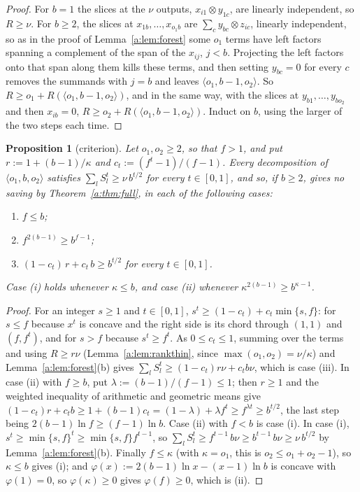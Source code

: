 \documentclass[11pt]{article}
\newtheorem{proposition}[theorem]{Proposition}
\theoremstyle{definition}
\theoremstyle{remark}
\begin{document}
\begin{proof}
For $b=1$ the slices at the $\nu$ outputs, $x_{i1}\otimes y_{1c}$, are linearly independent, so $R\ge \nu$. For $b\ge2$, the slices at $x_{1b},\dots,x_{o_1b}$ are $\sum_cy_{bc}\otimes z_{ic}$, linearly independent, so as in the proof of Lemma~\ref{a:lem:forest} some $o_1$ terms have left factors spanning a complement of the span of the $x_{ij}$, $j<b$. Projecting the left factors onto that span along them kills these terms, and then setting $y_{bc}=0$ for every $c$ removes the summands with $j=b$ and leaves $\langle o_1,b-1,o_2\rangle$. So $R\ge o_1+R(\langle o_1,b-1,o_2\rangle)$, and in the same way, with the slices at $y_{b1},\dots,y_{bo_2}$ and then $x_{ib}=0$, $R\ge o_2+R(\langle o_1,b-1,o_2\rangle)$. Induct on $b$, using the larger of the two steps each time.
\end{proof}

\begin{proposition}[criterion]\label{a:prop:criterion}
Let $o_1,o_2\ge2$, so that $f>1$, and put $r:=1+(b-1)/\kappa$ and $c_t:=(f^t-1)/(f-1)$. Every decomposition of $\langle o_1,b,o_2\rangle$ satisfies $\sum_lS_l^t\ge \nu\,b^{t/2}$ for every $t\in[0,1]$, and so, if $b\ge2$, gives no saving by Theorem~\ref{a:thm:full}, in each of the following cases:
\begin{enumerate}[label=(\roman*),nosep]
\item $f\le b$;
\item $f^{2(b-1)}\ge b^{f-1}$;
\item $(1-c_t)\,r+c_t\,b\ge b^{t/2}$ for every $t\in[0,1]$.
\end{enumerate}
Case (i) holds whenever $\kappa\le b$, and case (ii) whenever $\kappa^{2(b-1)}\ge b^{\kappa-1}$.
\end{proposition}

\begin{proof}
For an integer $s\ge1$ and $t\in[0,1]$, $s^t\ge(1-c_t)+c_t\min\{s,f\}$: for $s\le f$ because $x^t$ is concave and the right side is its chord through $(1,1)$ and $(f,f^t)$, and for $s>f$ because $s^t\ge f^t$. As $0\le c_t\le1$, summing over the terms and using $R\ge r\nu$ (Lemma~\ref{a:lem:rankthin}, since $\max(o_1,o_2)=\nu/\kappa$) and Lemma~\ref{a:lem:forest}(b) gives $\sum_lS_l^t\ge(1-c_t)r\nu+c_tb\nu$, which is case (iii). In case (ii) with $f\ge b$, put $\lambda:=(b-1)/(f-1)\le1$; then $r\ge1$ and the weighted inequality of arithmetic and geometric means give $(1-c_t)r+c_tb\ge1+(b-1)c_t=(1-\lambda)+\lambda f^t\ge f^{\lambda t}\ge b^{t/2}$, the last step being $2(b-1)\ln f\ge(f-1)\ln b$. Case (ii) with $f<b$ is case (i). In case (i), $s^t\ge\min\{s,f\}^t\ge\min\{s,f\}f^{t-1}$, so $\sum_lS_l^t\ge f^{t-1}\,b\nu\ge b^{t-1}\,b\nu\ge \nu\,b^{t/2}$ by Lemma~\ref{a:lem:forest}(b). Finally $f\le\kappa$ (with $\kappa=o_1$, this is $o_2\le o_1+o_2-1$), so $\kappa\le b$ gives (i); and $\varphi(x):=2(b-1)\ln x-(x-1)\ln b$ is concave with $\varphi(1)=0$, so $\varphi(\kappa)\ge0$ gives $\varphi(f)\ge0$, which is (ii).
\end{proof}
\end{document}
